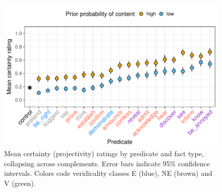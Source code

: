 \documentclass[12pt,fleqn]{article}
\newcommand{\6}{\mbox{$[\hspace*{-.6mm}[$}}
\newcommand{\9}{\mbox{$]\hspace*{-.6mm}]$}}
\begin{document}
\vspace*{-.8cm}

\begin{figure}[h!]
\centering

\includegraphics[width=.6\paperwidth]{../results/3-projectivity/graphs/means-projectivity-by-predicate-and-facttype}

\caption{\footnotesize{Mean certainty (projectivity) ratings by predicate and fact type, collapsing across complements. Error bars indicate 95\% confidence intervals. Colors code veridicality classes E (blue), NE (brown) and V (green).}}
\label{f-projectivity}
\end{figure}

\vspace*{-1cm}

\begin{scriptsize}


\end{scriptsize}
\end{document}
